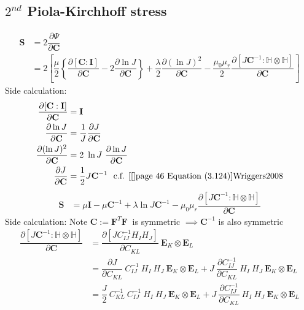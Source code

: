 \documentclass[11pt,a4paper,final]{article}
\begin{document}
\subsection{$2^{nd}$ Piola-Kirchhoff stress}
\begin{align*}
\mathbf{S} &= 2 \dfrac{\partial \Psi}{\partial \mathbf{C}} \\
&= 2 \left[ \dfrac{\mu}{2} \left\lbrace \dfrac{\partial [\mathbf{C} : \mathbf{I}]}{\partial \mathbf{C}} - 2 \dfrac{\partial \ln J}{\partial \mathbf{C}} \right\rbrace + \dfrac{\lambda}{2} \dfrac{\partial (\ln J)^2}{\partial \mathbf{C}} - \dfrac{\mu_0 \mu_r}{2} \dfrac{\partial [J \mathbf{C}^{-1} : \mathbb{H} \otimes \mathbb{H}]}{\partial \mathbf{C}} \right]
\end{align*}
Side calculation:
\begin{align*}
\dfrac{\partial [\mathbf{C} : \mathbf{I}]}{\partial \mathbf{C}} &= \mathbf{I} \\ 
\dfrac{\partial \ln J}{\partial \mathbf{C}} &= \dfrac{1}{J} \dfrac{\partial J}{\partial \mathbf{C}} \\
\dfrac{\partial (\ln J)^2}{\partial \mathbf{C}} &= 2 \ \ln J \ \dfrac{\partial \ln J}{\partial \mathbf{C}} \\
\dfrac{\partial J}{\partial \mathbf{C}} &= \dfrac{1}{2} J \mathbf{C}^{-1} \ \  \text{c.f. \cite[see][page 46 Equation (3.124)]{Wriggers2008}}
\end{align*}
\begin{align*}
\mathbf{S} &= \mu \mathbf{I} -  \mu \mathbf{C}^{-1} + \lambda \ln J \mathbf{C}^{-1} - \mu_0 \mu_r \dfrac{\partial [J \mathbf{C}^{-1} : \mathbb{H} \otimes \mathbb{H}]}{\partial \mathbf{C}}
\end{align*}
Side calculation: Note $\mathbf{C} := \mathbf{F}^T \mathbf{F} \ $ is symmetric $\implies \mathbf{C}^{-1}$ is also symmetric 
\begin{align*}
\dfrac{\partial [J \mathbf{C}^{-1} : \mathbb{H} \otimes \mathbb{H}]}{\partial \mathbf{C}} &= \dfrac{\partial [J C^{-1}_{IJ} H_I H_J]}{\partial C_{KL}} \ \mathbf{E}_K \otimes \mathbf{E}_L \\
&= \dfrac{\partial J}{\partial C_{KL}} \ C^{-1}_{IJ} \ H_I \ H_J \ \mathbf{E}_K \otimes \mathbf{E}_L + J \ \dfrac{\partial C^{-1}_{IJ}}{\partial C_{KL}} \ H_I \ H_J \ \mathbf{E}_K \otimes \mathbf{E}_L \\
&= \dfrac{J}{2} \ C^{-1}_{KL} \ C^{-1}_{IJ} \ H_I \ H_J \ \mathbf{E}_K \otimes \mathbf{E}_L + J \ \dfrac{\partial C^{-1}_{IJ}}{\partial C_{KL}} \ H_I \ H_J \ \mathbf{E}_K \otimes \mathbf{E}_L
\end{align*}
\end{document}
